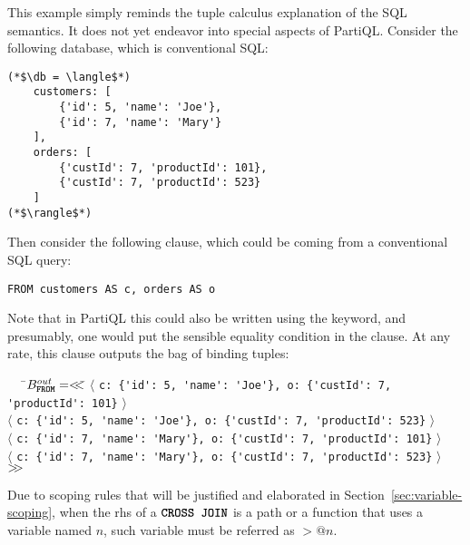 \begin{example}
This example simply reminds the tuple calculus explanation of the
\from SQL semantics. It does not yet endeavor into special aspects
of PartiQL. Consider the following database, which is conventional SQL:

\begin{lstlisting}
(*$\db = \langle$*)
    customers: [
        {'id': 5, 'name': 'Joe'},
        {'id': 7, 'name': 'Mary'}
    ],
    orders: [
        {'custId': 7, 'productId': 101},
        {'custId': 7, 'productId': 523}
    ]
(*$\rangle$*)
\end{lstlisting}

\noindent Then consider the following \from clause, which could be coming from
a conventional SQL query:

\begin{lstlisting}
FROM customers AS c, orders AS o
\end{lstlisting}

\noindent Note that in PartiQL this could also be written using the \CROSSJOIN
keyword, and presumably, one would put the sensible equality condition
 in the  clause. At any rate, this \from clause
outputs the bag of binding tuples:

\begin{tabbing}
\ \ \ \=$B^{out}_{\texttt{\textbf{FROM}}} = <\!\!< $\=
    $\langle$ \lstinline|c: {'id': 5, 'name': 'Joe'}, o: {'custId': 7, 'productId': 101}| $\rangle$\\
\>\>$\langle$ \lstinline|c: {'id': 5, 'name': 'Joe'}, o: {'custId': 7, 'productId': 523}| $\rangle$\\
\>\>$\langle$ \lstinline|c: {'id': 7, 'name': 'Mary'}, o: {'custId': 7, 'productId': 101}| $\rangle$\\
\>\>$\langle$ \lstinline|c: {'id': 7, 'name': 'Mary'}, o: {'custId': 7, 'productId': 523}| $\rangle$\\
\>\>$>\!\!>$
\end{tabbing}

\end{example}

\noindent Due to scoping rules that will be justified and elaborated in
Section~\ref{sec:variable-scoping}, when the rhs of a $\texttt{\textbf{CROSS JOIN}}$ is a path or a
function that uses a variable named $n$, such variable must be referred as
$\gt{@}n$. 


